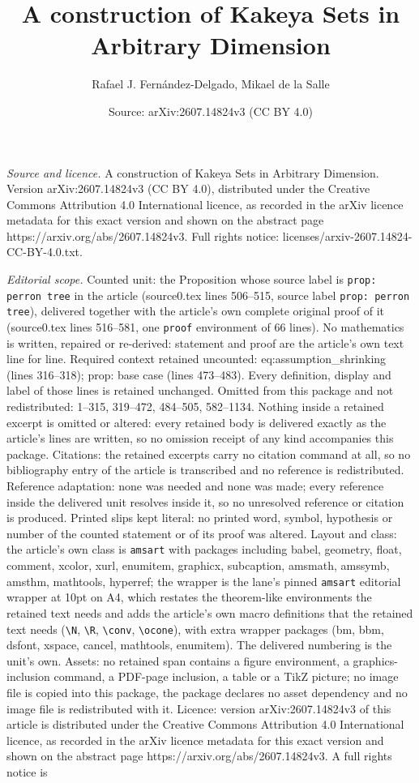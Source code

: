 \documentclass[10pt,a4paper]{amsart}
\title[A construction of Kakeya Sets in Arbitrary Dimension]{A construction of Kakeya Sets in Arbitrary Dimension}
\author{Rafael J. Fern\'andez-Delgado, Mikael de la Salle}
\date{Source: arXiv:2607.14824v3 (CC BY 4.0)}
\begin{document}
\maketitle

\noindent\emph{Source and licence.} A construction of Kakeya Sets in Arbitrary Dimension. Version arXiv:2607.14824v3 (CC BY 4.0), distributed under the Creative Commons Attribution 4.0 International licence, as recorded in the arXiv licence metadata for this exact version and shown on the abstract page https://arxiv.org/abs/2607.14824v3. Full rights notice: licenses/arxiv-2607.14824-CC-BY-4.0.txt.\par\smallskip

\noindent\textit{Editorial scope.} Counted unit: the Proposition whose source label is \texttt{prop: perron tree} in the article (source0.tex lines 506--515, source label \texttt{prop: perron tree}), delivered together with the article's own complete original proof of it (source0.tex lines 516--581, one \texttt{proof} environment of 66 lines). No mathematics is written, repaired or re-derived: statement and proof are the article's own text line for line. Required context retained uncounted: eq:assumption\_shrinking (lines 316--318); prop: base case (lines 473--483). Every definition, display and label of those lines is retained unchanged. Omitted from this package and not redistributed: 1--315, 319--472, 484--505, 582--1134. Nothing inside a retained excerpt is omitted or altered: every retained body is delivered exactly as the article's lines are written, so no omission receipt of any kind accompanies this package. Citations: the retained excerpts carry no citation command at all, so no bibliography entry of the article is transcribed and no reference is redistributed. Reference adaptation: none was needed and none was made; every reference inside the delivered unit resolves inside it, so no unresolved reference or citation is produced. Printed slips kept literal: no printed word, symbol, hypothesis or number of the counted statement or of its proof was altered. Layout and class: the article's own class is \texttt{amsart} with packages including babel, geometry, float, comment, xcolor, xurl, enumitem, graphicx, subcaption, amsmath, amssymb, amsthm, mathtools, hyperref; the wrapper is the lane's pinned \texttt{amsart} editorial wrapper at 10pt on A4, which restates the theorem-like environments the retained text needs and adds the article's own macro definitions that the retained text needs (\texttt{\textbackslash N}, \texttt{\textbackslash R}, \texttt{\textbackslash conv}, \texttt{\textbackslash ocone}), with extra wrapper packages (bm, bbm, dsfont, xspace, cancel, mathtools, enumitem). The delivered numbering is the unit's own. Assets: no retained span contains a figure environment, a graphics-inclusion command, a PDF-page inclusion, a table or a TikZ picture; no image file is copied into this package, the package declares no asset dependency and no image file is redistributed with it. Licence: version arXiv:2607.14824v3 of this article is distributed under the Creative Commons Attribution 4.0 International licence, as recorded in the arXiv licence metadata for this exact version and shown on the abstract page https://arxiv.org/abs/2607.14824v3. A full rights notice is 
\end{document}
